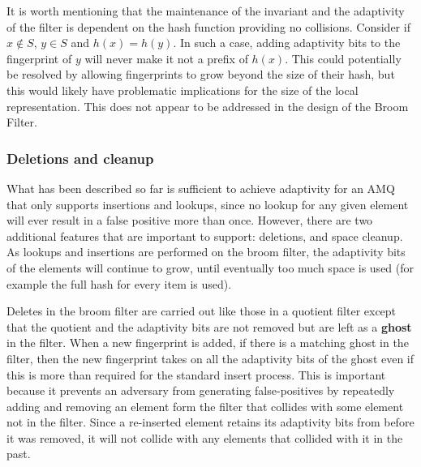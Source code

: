 \documentclass[../paper.tex]{subfiles}
\begin{document}
It is worth mentioning that the maintenance of the
invariant and the adaptivity of the filter is dependent on the hash
function providing no collisions.  Consider if $x \notin S$, $y \in S$ and  $h(x)
= h(y)$.  In such a case, adding adaptivity bits to the fingerprint of $y$
will never make it not a prefix of $h(x)$.  This could potentially be
resolved by allowing fingerprints to grow beyond the size of their hash,
but this would likely have problematic implications for the size of the
local representation.  This does not appear to be addressed in the design
of the Broom Filter.  

\subsubsection{Deletions and cleanup}

What has been described so far is sufficient to achieve adaptivity for an AMQ that
only supports insertions and lookups, since no lookup for any given element will
ever result in a false positive more than once. However, there are two additional
features that are important to support: deletions, and space cleanup. As lookups and
insertions are performed on the broom filter, the adaptivity bits of the elements will
continue to grow, until eventually too much space is used (for example the full hash
for every item is used).
     
Deletes in the broom filter are carried out like
those in a quotient filter except that the quotient and the adaptivity
bits are not removed but are left as a {\bf ghost} in the filter.  When a
new fingerprint is added, if there is a matching ghost in the filter, then
the new fingerprint takes on all the adaptivity bits of the ghost even  if
this is more than required for the standard insert process. 
This is important because it prevents an adversary from generating false-positives
by repeatedly adding and removing an element form the filter that collides with
some element not in the filter. Since a re-inserted element retains its
adaptivity bits from before it was removed, it will not collide with any
elements that collided with it in the past.
\end{document}
